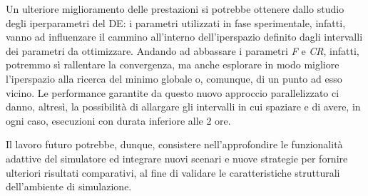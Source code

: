 Un ulteriore miglioramento delle prestazioni si potrebbe ottenere dallo studio degli iperparametri del DE: i parametri utilizzati in fase sperimentale, infatti, vanno ad influenzare il cammino all'interno dell'iperspazio definito dagli intervalli dei parametri da ottimizzare.
Andando ad abbassare i parametri \textit{F} e \textit{CR}, infatti, potremmo sì rallentare la convergenza, ma anche esplorare in modo migliore l'iperspazio alla ricerca del minimo globale o, comunque, di un punto ad esso vicino.
Le performance garantite da questo nuovo approccio parallelizzato ci danno, altresì, la possibilità di allargare gli intervalli in cui spaziare e di avere, in ogni caso, esecuzioni con durata inferiore alle 2 ore. 

Il lavoro futuro potrebbe, dunque, consistere nell’approfondire le funzionalità adattive del simulatore ed integrare nuovi scenari e nuove strategie per fornire ulteriori risultati comparativi, al fine di validare le caratteristiche strutturali dell’ambiente di simulazione.